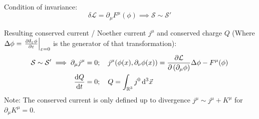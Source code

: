 		\noindent
		Condition of invariance:
		\begin{equation}
			\delta\mathcal{L} = \partial_\mu F^\mu(\phi)
			\implies \mathcal{S} \sim \mathcal{S}'
		\end{equation}

		\noindent
		Resulting conserved current / Noether current $j^{\mu}$ and conserved charge $Q$ (Where $\Delta \phi = \eval{\pdv{\delta_\varepsilon \phi}{\varepsilon}}_{\varepsilon=0}$ is the generator of that transformation):
		\begin{equation}
			\begin{aligned}
				\mathcal{S} \sim \mathcal{S}' \implies
				\partial_\mu j^\mu &= 0;\quad
				j^\mu \qty( \phi(x), \partial_\nu\phi(x) ) = \pdv{\mathcal{L}}{\left(\partial_\mu \phi\right)}\Delta\phi - F^\mu(\phi) \\
				\dv{Q}{t} &= 0; \quad Q = \int_{\mathbb{R}^3} j^0\dd[3]{\vec{x}} \\
			\end{aligned}
		\end{equation}
		Note: The conserved current is only defined up to divergence $j^\mu \sim j^\mu + K^\mu$ for $\partial_\mu K^\mu = 0$.